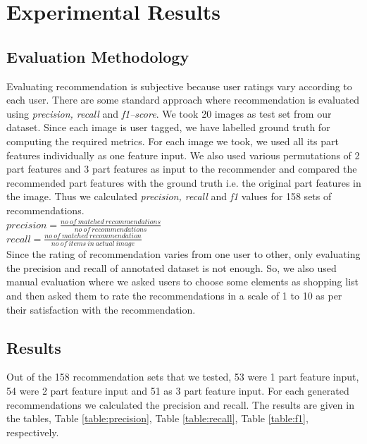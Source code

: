 \chapter{Experimental Results}

\section{Evaluation Methodology}

Evaluating recommendation is subjective because user ratings vary according to each user. There are some standard approach where recommendation is evaluated using \textit{precision, recall} and \textit{f1--score}. We took 20 images as test set from our dataset. Since each image is user tagged, we have labelled ground truth for computing the required metrics. For each image we took, we used all its part features individually as one feature input. We also used various permutations of 2 part features and 3 part features as input to the recommender and compared the recommended part features with the ground truth i.e. the original part features in the image. Thus we calculated \textit{precision, recall} and \textit{f1} values for 158 sets of recommendations.
\\
\newline
$precision = \frac{no \ of \ matched \ recommendations}{no \ of \ recommendations}$	\\
$recall = \frac{no \ of \ matched \ recommendation}{no \ of \ items \ in \ actual \ image}$\\

Since the rating of recommendation varies from one user to other, only evaluating the precision and recall of annotated dataset is not enough. So, we also used manual evaluation where we asked users to choose some elements as shopping list and then asked them to rate the recommendations in a scale of 1 to 10 as per their satisfaction with the recommendation.

\section{Results}

Out of the 158 recommendation sets that we tested, 53 were 1 part feature input, 54 were 2 part feature input and 51 as 3 part feature input. For each generated recommendations we calculated the precision and recall. The results are given in the tables, Table \ref{table:precision}, Table \ref{table:recall}, Table \ref{table:f1}, respectively.

